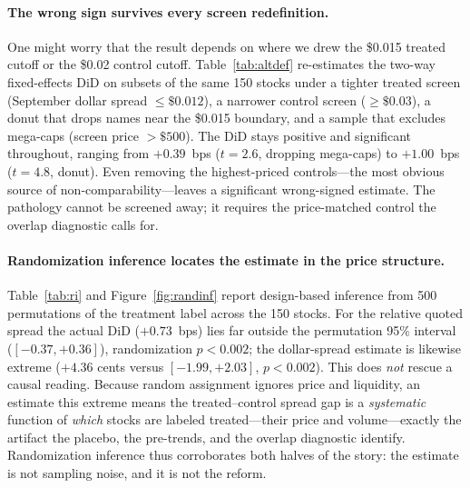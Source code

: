 \documentclass[12pt]{article}
\begin{document}
\paragraph{The wrong sign survives every screen redefinition.} One might worry that the result
depends on where we drew the \$0.015 treated cutoff or the \$0.02 control cutoff.
Table~\ref{tab:altdef} re-estimates the two-way fixed-effects DiD on subsets of the same 150
stocks under a tighter treated screen (September dollar spread $\le\$0.012$), a narrower control
screen ($\ge\$0.03$), a donut that drops names near the \$0.015 boundary, and a sample that
excludes mega-caps (screen price $>\$500$). The DiD stays positive and significant throughout,
ranging from $+0.39$~bps ($t=2.6$, dropping mega-caps) to $+1.00$~bps ($t=4.8$, donut). Even
removing the highest-priced controls---the most obvious source of non-comparability---leaves a
significant wrong-signed estimate. The pathology cannot be screened away; it requires the
price-matched control the overlap diagnostic calls for.

\paragraph{Randomization inference locates the estimate in the price structure.}
Table~\ref{tab:ri} and Figure~\ref{fig:randinf} report design-based inference from 500
permutations of the treatment label across the 150 stocks. For the relative quoted spread the
actual DiD ($+0.73$~bps) lies far outside the permutation 95\% interval
($[-0.37,+0.36]$), randomization $p<0.002$; the dollar-spread estimate is likewise extreme
($+4.36$ cents versus $[-1.99,+2.03]$, $p<0.002$). This does \emph{not} rescue a causal reading.
Because random assignment ignores price and liquidity, an estimate this extreme means the
treated--control spread gap is a \emph{systematic} function of \emph{which} stocks are labeled
treated---their price and volume---exactly the artifact the placebo, the pre-trends, and the
overlap diagnostic identify. Randomization inference thus corroborates both halves of the story:
the estimate is not sampling noise, and it is not the reform.
\end{document}
